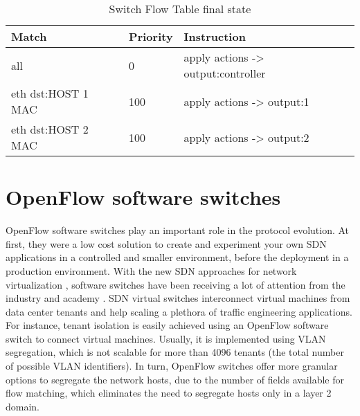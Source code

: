 \begin{enumerate}
\begin{table}[H]
\centering
\caption{Switch Flow Table final state}
\label{tab:finaltable}
\begin{tabular}{|l|l|l|}
\hline
\textbf{Match}                 & \textbf{Priority}   & \textbf{Instruction}                              \\ \hline
all                            & 0                   & apply actions -> output:controller                \\ \hline
eth dst:HOST 1 MAC             & 100                 & apply actions -> output:1                         \\ \hline
eth dst:HOST 2 MAC             & 100                 & apply actions -> output:2                         \\ \hline
\end{tabular}
\end{table}

\end{enumerate}        

\section{OpenFlow software switches}
\label{sec:sec22}

OpenFlow software switches play an important role in the protocol evolution. At first, they were a low cost solution to create and experiment your own SDN applications in a controlled and smaller environment, before the deployment in a production environment. With the new SDN approaches for network virtualization \cite{Tseng:2011:NVC:2117686.2118540} \cite{Drutskoy_scalablenetwork}, software switches have been receiving a lot of attention from the industry \cite{NSX} and academy \cite{DBLP:confcloudnetEmmerichRWC14}. SDN virtual switches interconnect virtual machines from data center tenants and help scaling a plethora of traffic engineering applications. For instance, tenant isolation is easily achieved using an OpenFlow software switch to connect virtual machines. Usually, it is implemented using VLAN segregation, which is not scalable for more than 4096 tenants (the total number of possible VLAN identifiers). In turn, OpenFlow switches offer more granular options to segregate the network hosts, due to the number of fields available for flow matching, which eliminates the need to segregate hosts only in a layer 2 domain.

